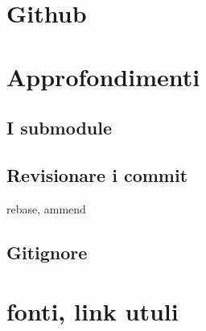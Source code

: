 \documentclass{article} \usepackage[textwidth=18cm,textheight=18cm]{geometry}
\begin{document}
\section{Github}

\section{Approfondimenti}

\subsection{I submodule}

\subsection{Revisionare i commit}

rebase, ammend

\subsection{Gitignore}

\section{fonti, link utuli}
\end{document}
